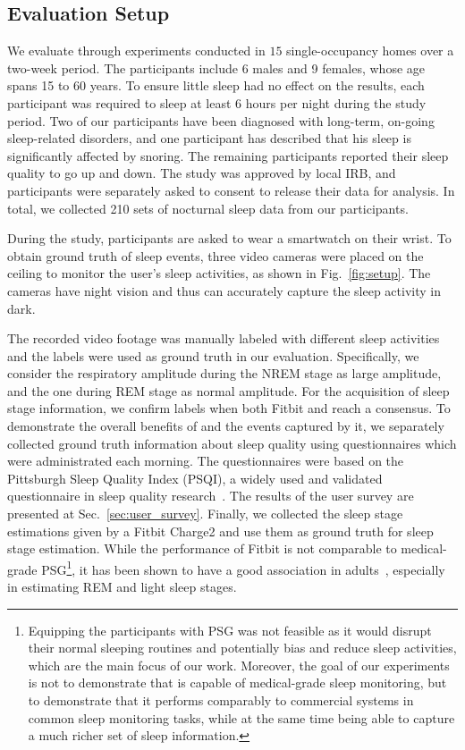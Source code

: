 \subsection{Evaluation Setup\label{sec:evalusers}}

 We evaluate {\systemname} through experiments conducted in $15$ single-occupancy homes over a two-week period.
The participants include 6 males and 9 females, whose age spans 15 to 60 years. To ensure little sleep had no effect on the results, each
participant was required to sleep at least $6$ hours per night during the study period. Two of our participants have been diagnosed with
long-term, on-going sleep-related disorders, and one participant has described that his sleep is significantly affected by snoring. The
remaining participants reported their sleep quality to go up and down. The study was approved by local IRB, and participants were
separately asked to consent to release their data for analysis. In total, we collected 210 sets of nocturnal sleep data from our
participants.

 During the study, participants are asked to wear a smartwatch on their wrist. To obtain ground truth of sleep events,
three video cameras were placed on the ceiling to monitor the user's sleep activities, as shown in Fig.~\ref{fig:setup}. The cameras have
night vision and thus can accurately capture the sleep activity in dark.


 The recorded video footage was manually labeled with different sleep activities and the labels
were used as ground truth in our evaluation. Specifically, we consider the respiratory amplitude during the NREM stage as large amplitude,
and the one during REM stage as normal amplitude. For the acquisition of sleep stage information, we confirm labels when both Fitbit and
{\systemname} reach a consensus. To demonstrate the overall benefits of {\systemname} and the events captured by it, we separately
collected ground truth information about sleep quality using questionnaires which were administrated each morning. The questionnaires were
based on the Pittsburgh Sleep Quality Index (PSQI), a widely used and validated questionnaire in sleep quality
research~\cite{buysse1989pittsburgh}. The results of the user survey are presented at Sec.~\ref{sec:user_survey}. Finally, we collected the
sleep stage estimations given by a Fitbit Charge2 and use them as ground truth for sleep stage estimation. While the performance of Fitbit
is not comparable to medical-grade PSG\footnote{Equipping the participants with PSG was not feasible as it would disrupt their normal
sleeping routines and potentially bias and reduce sleep activities, which are the main focus of our work. Moreover, the goal of our
experiments is not to demonstrate that {\systemname} is capable of medical-grade sleep monitoring, but to demonstrate that it performs
comparably to commercial systems in common sleep monitoring tasks, while at the same time being able to capture a much richer set of sleep
information.}, it has been shown to have a good association in adults~\cite{evenson2015systematic,fitbit01,fitbit02,fitbit03}, especially
in estimating REM and light sleep stages.



